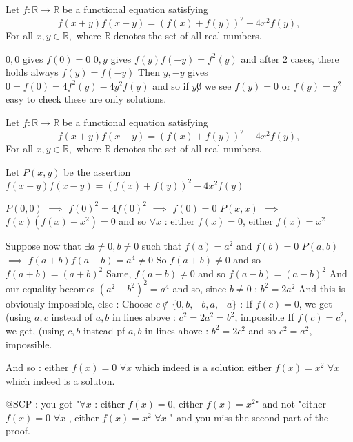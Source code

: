 \begin{solution}
	\begin{tcolorbox}Let $f:\mathbb{R}\to \mathbb R$ be a functional equation satisfying
\[f(x+y)f(x-y)=\left(f(x)+f(y)\right)^2-4x^2f(y),\]
For all $x,y\in\mathbb R,$ where $\mathbb R$ denotes the set of all real numbers.\end{tcolorbox}

$0,0$ gives $f(0)=0$ 
$0,y$ gives $f(y)f(-y)=f^2(y)$ and after $2$ cases, there holds always $f(y)=f(-y)$
Then $y,-y$ gives $0=f(0)=4f^2(y)-4y^2f(y)$
and so if $y \not 0$ we see $f(y)=0$ or $f(y)=y^2$
easy to check these are only solutions.
\end{solution}



\begin{solution}
	\begin{tcolorbox}Let $f:\mathbb{R}\to \mathbb R$ be a functional equation satisfying
\[f(x+y)f(x-y)=\left(f(x)+f(y)\right)^2-4x^2f(y),\]
For all $x,y\in\mathbb R,$ where $\mathbb R$ denotes the set of all real numbers.\end{tcolorbox}
Let $P(x,y)$ be the assertion $f(x+y)f(x-y)=(f(x)+f(y))^2-4x^2f(y)$

$P(0,0)$ $\implies$ $f(0)^2=4f(0)^2$ $\implies$ $f(0)=0$
$P(x,x)$ $\implies$ $f(x)(f(x)-x^2)=0$ and so $\forall x$ : either $f(x)=0$, either $f(x)=x^2$

Suppose now that $\exists a\ne 0, b\ne 0$ such that $f(a)=a^2$ and $f(b)=0$
$P(a,b)$ $\implies$ $f(a+b)f(a-b)=a^4\ne 0$
So $f(a+b)\ne 0$ and so $f(a+b)=(a+b)^2$
Same, $f(a-b)\ne 0$ and so $f(a-b)=(a-b)^2$
And our equality becomes $(a^2-b^2)^2=a^4$ and so, since $b\ne 0$ : $b^2=2a^2$
And this is obviously impossible, else :
Choose $c\notin\{0,b,-b,a,-a\}$ :
If $f(c)=0$, we get (using $a,c$ instead of $a,b$ in lines above : $c^2=2a^2=b^2$, impossible
If $f(c)=c^2$, we get, (using $c,b$ instead pf $a,b$ in lines above : $b^2=2c^2$ and so $c^2=a^2$, impossible.

And so :
either $f(x)=0$ $\forall x$ which indeed is a solution
either $f(x)=x^2$ $\forall x$ which indeed is a soluton.

@SCP : you got "$\forall x$ : either $f(x)=0$, either $f(x)=x^2$" and not "either $f(x)=0$ $\forall x$ , either $f(x)=x^2$ $\forall x$ " and you miss the second part of the proof.
\end{solution}



